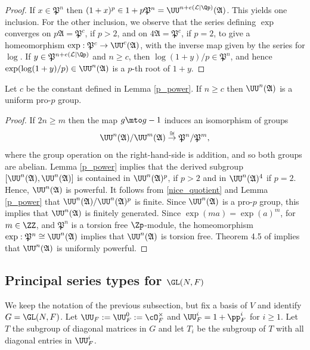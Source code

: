 \begin{proof} If $x\in \mathfrak P^n$ then $(1+x)^p\in 1 + p\mathfrak P^n= \UU^{n+e(\mathcal L|\Qp)}(\mathfrak A)$. This yields one inclusion. For the other
inclusion, we observe that the series defining $\exp$ converges on $p \mathfrak A=\mathfrak P^c$, if $p>2$, and on $4 \mathfrak A= \mathfrak P^c$, if $p=2$, to give
a homeomorphism $\exp: \mathfrak P^c\to \UU^{c}(\mathfrak A)$, with the inverse map given by the series for $\log$. If $y\in \mathfrak P^{n+e(\mathcal L|\Qp)}$
and $n\ge c$, then $\log(1+y)/p \in \mathfrak P^n$, and hence $\exp(\log(1+y)/p)\in \UU^n(\mathfrak A)$ is a $p$-th root of $1+y$.
\end{proof}

\begin{prop}\label{uniform} Let $c$ be the constant defined in Lemma \ref{p_power}. If $n\ge c$ then $\UU^n(\mathfrak A)$ is a uniform pro-$p$ group.
\end{prop}

\begin{proof} If $2n\ge m$ then the map $g\mto g-1$ induces an isomorphism of groups
\begin{equation}\label{nice_quotient}
\UU^{n}(\mathfrak A)/\UU^{m}(\mathfrak A)\overset{\cong}{\to}\mathfrak P^n/\mathfrak P^m,
\end{equation}
where the group operation on the right-hand-side is addition, and so both groups are abelian. Lemma \ref{p_power} implies that the derived subgroup
$[\UU^n(\mathfrak A), \UU^n(\mathfrak A)]$ is contained in $\UU^n(\mathfrak A)^p$, if $p>2$ and in $\UU^n(\mathfrak A)^4$ if $p=2$. Hence, $\UU^n(\mathfrak A)$ is powerful. It follows from
\eqref{nice_quotient} and Lemma \ref{p_power} that $\UU^n(\mathfrak A)/ \UU^n(\mathfrak A)^p$ is finite. Since $\UU^n(\mathfrak A)$ is a pro-$p$
group, this implies that $\UU^n(\mathfrak A)$ is finitely generated. Since $\exp(m a)= \exp(a)^m$, for $m\in \ZZ$, and $\mathfrak P^n$ is a torsion free $\Zp$-module, the homeomorphism
$\exp: \mathfrak P^n \cong \UU^n(\mathfrak A)$ implies that $\UU^n(\mathfrak A)$ is torsion free. Theorem 4.5 of \cite{analytic} implies that $\UU^n(\mathfrak A)$ is uniformly powerful.
\end{proof}

\subsection{Principal series types for $\GL(N, F)$}\label{sec_prince} We keep the notation of the previous subsection, but fix a basis of $V$ and identify $G=\GL(N, F)$.
Let $\UU_F:=\UU^0_F:=\cO_F^{\times}$ and $\UU^i_F=1+\pp_F^i$ for $i\ge 1$. Let $T$ the subgroup of diagonal matrices in $G$ and
let $T_i$ be the subgroup of $T$ with all diagonal entries in $\UU^i_F$.

